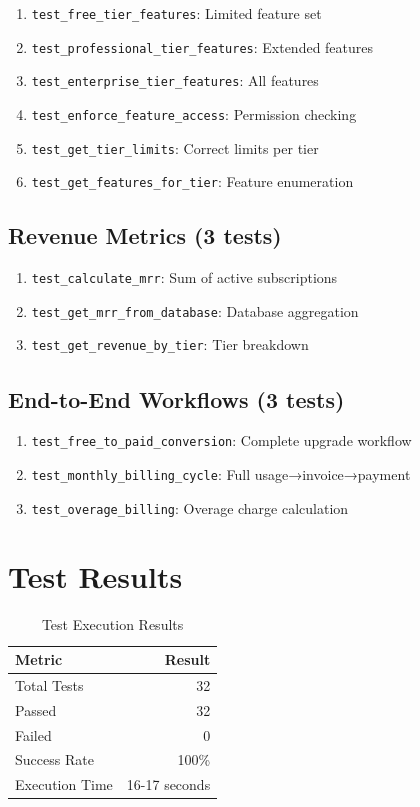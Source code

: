 \documentclass[12pt]{report}
\begin{document}
\begin{enumerate}
    \item \lstinline{test_free_tier_features}: Limited feature set
    \item \lstinline{test_professional_tier_features}: Extended features
    \item \lstinline{test_enterprise_tier_features}: All features
    \item \lstinline{test_enforce_feature_access}: Permission checking
    \item \lstinline{test_get_tier_limits}: Correct limits per tier
    \item \lstinline{test_get_features_for_tier}: Feature enumeration
\end{enumerate}

\subsection{Revenue Metrics (3 tests)}

\begin{enumerate}
    \item \lstinline{test_calculate_mrr}: Sum of active subscriptions
    \item \lstinline{test_get_mrr_from_database}: Database aggregation
    \item \lstinline{test_get_revenue_by_tier}: Tier breakdown
\end{enumerate}

\subsection{End-to-End Workflows (3 tests)}

\begin{enumerate}
    \item \lstinline{test_free_to_paid_conversion}: Complete upgrade workflow
    \item \lstinline{test_monthly_billing_cycle}: Full usage→invoice→payment
    \item \lstinline{test_overage_billing}: Overage charge calculation
\end{enumerate}

\section{Test Results}

\begin{table}[h]
\centering
\begin{tabular}{lr}
\toprule
\textbf{Metric} & \textbf{Result} \\
\midrule
Total Tests & 32 \\
Passed & 32 \\
Failed & 0 \\
Success Rate & 100\% \\
Execution Time & 16-17 seconds \\
\bottomrule
\end{tabular}
\caption{Test Execution Results}
\end{table}
\end{document}
